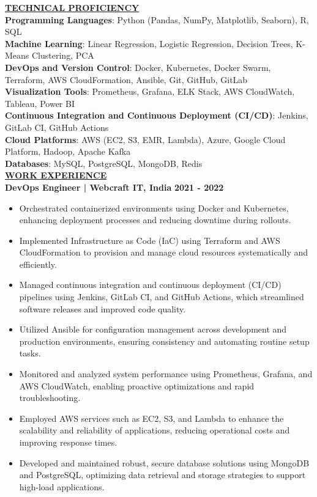 \documentclass{article}
\begin{document}
\noindent \textbf{\underline{TECHNICAL PROFICIENCY}} \\
\textbf{Programming Languages}{: \small Python (Pandas, NumPy, Matplotlib, Seaborn), R, SQL} \\
\textbf{Machine Learning}{: \small Linear Regression, Logistic Regression, Decision Trees, K-Means Clustering, PCA} \\
\textbf{DevOps and Version Control}{: \small Docker, Kubernetes, Docker Swarm, Terraform, AWS CloudFormation, Ansible, Git, GitHub, GitLab} \\
\textbf{Visualization Tools}{: \small Prometheus, Grafana, ELK Stack, AWS CloudWatch, Tableau, Power BI} \\
\textbf{Continuous Integration and Continuous Deployment (CI/CD)}{: \small Jenkins, GitLab CI, GitHub Actions} \\
\textbf{Cloud Platforms}{: \small AWS (EC2, S3, EMR, Lambda), Azure, Google Cloud Platform, Hadoop, Apache Kafka} \\
\textbf{Databases}{: \small MySQL, PostgreSQL, MongoDB, Redis} \\


\noindent \textbf{\underline{WORK EXPERIENCE}}\\
\noindent \textbf{DevOps Engineer | Webcraft IT, India} \hfill \textbf{2021 - 2022}
\begin{itemize}[noitemsep,nolistsep,leftmargin=*]
\item {\small Orchestrated containerized environments using Docker and Kubernetes, enhancing deployment processes and reducing downtime during rollouts.}
\item {\small Implemented Infrastructure as Code (IaC) using Terraform and AWS CloudFormation to provision and manage cloud resources systematically and efficiently.}
\item {\small Managed continuous integration and continuous deployment (CI/CD) pipelines using Jenkins, GitLab CI, and GitHub Actions, which streamlined software releases and improved code quality.}
\item {\small Utilized Ansible for configuration management across development and production environments, ensuring consistency and automating routine setup tasks.}
\item {\small Monitored and analyzed system performance using Prometheus, Grafana, and AWS CloudWatch, enabling proactive optimizations and rapid troubleshooting.}
\item {\small Employed AWS services such as EC2, S3, and Lambda to enhance the scalability and reliability of applications, reducing operational costs and improving response times.}
\item {\small Developed and maintained robust, secure database solutions using MongoDB and PostgreSQL, optimizing data retrieval and storage strategies to support high-load applications.}\\
\end{itemize}
\end{document}
